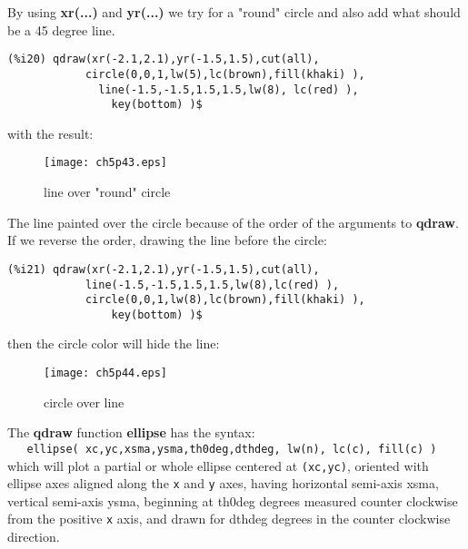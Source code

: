 \documentclass[12pt]{article}
\begin{document}
\smallskip
By using \textbf{xr(...)} and \textbf{yr(...)} we try for a "round" circle and also add
  what should be a 45 degree line.
\small
\begin{verbatim}
(%i20) qdraw(xr(-2.1,2.1),yr(-1.5,1.5),cut(all),
            circle(0,0,1,lw(5),lc(brown),fill(khaki) ),
              line(-1.5,-1.5,1.5,1.5,lw(8), lc(red) ),
                key(bottom) )$
\end{verbatim}
\normalsize
%
with the result:
\begin{figure} [h]
   \centerline{\texttt{[image: ch5p43.eps]} }
	\caption{line over "round" circle}
\end{figure}      
\newpage
The line painted over the circle because of the order of the arguments to
  \textbf{qdraw}.
If we reverse the order, drawing the line before the circle:
\small
\begin{verbatim}
(%i21) qdraw(xr(-2.1,2.1),yr(-1.5,1.5),cut(all),
            line(-1.5,-1.5,1.5,1.5,lw(8),lc(red) ),
            circle(0,0,1,lw(8),lc(brown),fill(khaki) ),
                key(bottom) )$
\end{verbatim}
\normalsize
%
then the circle color will hide the line:
\begin{figure} [h]
   \centerline{\texttt{[image: ch5p44.eps]} }
	\caption{circle over line}
\end{figure}      

\smallskip
The \textbf{qdraw} function \textbf{ellipse} has the syntax:\\
\verb|   ellipse( xc,yc,xsma,ysma,th0deg,dthdeg, lw(n), lc(c), fill(c) ) |\\
  which will plot a partial or whole ellipse centered at \verb|(xc,yc)|,
  oriented with ellipse axes aligned along the \verb|x| and \verb|y| axes,
  having horizontal semi-axis xsma, vertical semi-axis ysma, beginning
  at th0deg degrees measured counter clockwise from the  positive \verb|x| axis,
  and drawn for dthdeg degrees in the counter clockwise direction.
  
\end{document}

